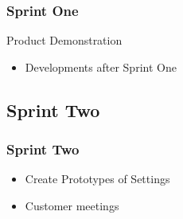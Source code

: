 \begin{frame}
\frametitle{Sprint One}

Product Demonstration
\begin{itemize}
\item Developments after Sprint One
\end{itemize}


\end{frame}

\subsection{Sprint Two}
\begin{frame}
\frametitle{Sprint Two}
\centering
\begin{itemize}
\item<1>Create Prototypes of Settings
\item<2>Customer meetings
\end{itemize}
\end{frame}

